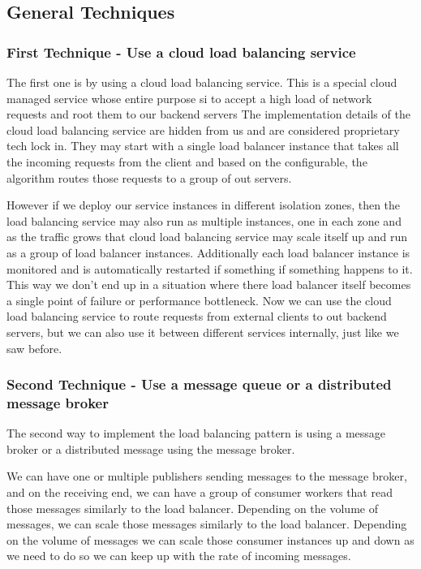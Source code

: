 \subsection{General Techniques}

\subsubsection{First Technique - Use a cloud load balancing service}
The first one is by using a cloud load balancing service.
This is a special cloud managed service whose entire purpose si to accept a high load of network requests and root them to our backend servers
The implementation details of the cloud load balancing service are hidden from us and are considered proprietary tech lock in.
They may start with a single load balancer instance that takes all the incoming requests from the client and based on the configurable, the algorithm routes those requests to a group of out servers.

However if we deploy our service instances in different isolation zones, then the load balancing service may also run as multiple instances, one in each zone and as the traffic grows that cloud load balancing service may scale itself up and run as a group of load balancer instances.
Additionally each load balancer instance is monitored and is automatically restarted if something if something happens to it.
This way we don't end up in a situation where there load balancer itself becomes a single point of failure or performance bottleneck.
Now we can use the cloud load balancing service to route requests from external clients to out backend servers, but we can also use it between different services internally, just like we saw before.

\subsubsection{Second Technique - Use a message queue or a distributed message broker}
The second way to implement the load balancing pattern is using a message broker or a distributed message using the message broker.

We can have one or multiple publishers sending messages to the message broker, and on the receiving end, we can have a group of consumer workers that read those messages similarly to the load balancer.
Depending on the volume of messages, we can scale those messages similarly to the load balancer.
Depending on the volume of messages we can scale those consumer instances up and down as we need to do so we can keep up with the rate of incoming messages.

